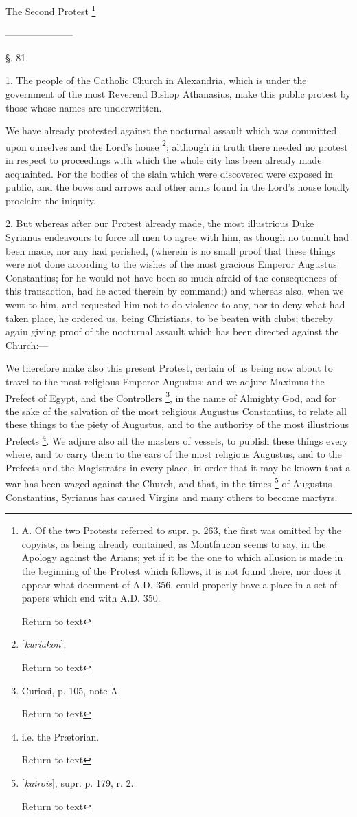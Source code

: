 The Second Protest \footnote{A. Of the two Protests referred to supr. p. 263,
the first was omitted by the copyists, as being already contained, as
Montfaucon seems to say, in the Apology against the Arians; yet if it
be the one to which allusion is made in the beginning of the Protest
which follows, it is not found there, nor does it appear what document
of A.D. 356. could properly have a place in a set of papers which
end with A.D.
350.

Return to text}

———————

§. 81.

1. The people of the Catholic Church in
Alexandria, which is under the government of the most Reverend Bishop
Athanasius, make this public protest by those whose names are
underwritten.

We have already protested against the nocturnal
assault which was committed upon ourselves and the Lord's house \footnote{[\emph{kuriakon}].

Return to text}; although in truth there needed no protest in respect to
proceedings with which the whole city has been already made
acquainted. For the bodies of the slain which were discovered were
exposed in public, and the bows and arrows and other arms found in the
Lord's house loudly proclaim the iniquity.

2. But whereas after our Protest already made,
the most illustrious Duke Syrianus endeavours to force all men to
agree with him, as though no tumult had been made, nor any had
perished, (wherein is no small proof that these things were not done
according to the wishes of the most gracious Emperor Augustus
Constantius; for he would not have been so much afraid of the
consequences of this transaction, had he acted therein by command;)
and whereas also, when we went to him, and requested him not to do
violence to any, nor to deny what had taken place, he ordered us,
being Christians, to be beaten with clubs; thereby again giving proof
of the nocturnal assault which has been directed against the
Church:—

We therefore make also this present Protest,
certain of us being now about to travel to the most religious Emperor
Augustus: and we adjure Maximus the Prefect of Egypt, and the
Controllers \footnote{Curiosi, p. 105, note A.

Return to text}, in the name of Almighty God, and for the sake
of the salvation of the most religious Augustus Constantius, to relate
all these things to the piety of Augustus, and to the authority of the
most illustrious Prefects \footnote{i.e. the
Prætorian.

Return to text}. We adjure also all the masters of
vessels, to publish these things every where, and to carry them to the
ears of the most religious Augustus, and to the Prefects and the
Magistrates in every place, in order that it may be known that a war
has been waged against the Church, and that, in the times \footnote{[\emph{kairois}], supr. p. 179, r. 2.

Return to text} of
Augustus Constantius, Syrianus has caused Virgins and many others to
become martyrs.

